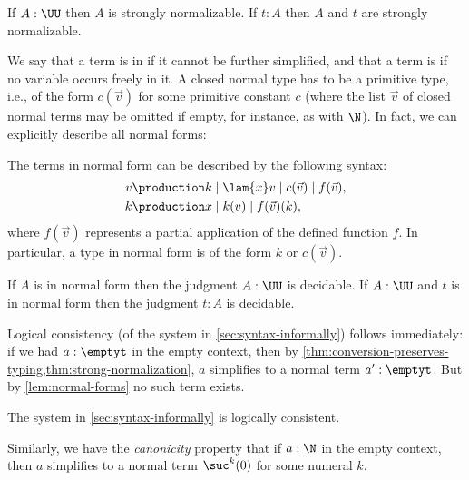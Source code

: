 \begin{thm}\label{thm:strong-normalization}
If $A : \UU$ then $A$ is strongly normalizable.
If $t:A$ then $A$ and $t$ are strongly normalizable.
\end{thm}

We say that a term is in 
%
%
if it cannot be further
simplified, and that a term is 
%
%
if no variable occurs freely in
it. A closed normal type has to be a primitive type, i.e., of the form
$c(\vec{v})$ for some primitive constant $c$ (where the list $\vec{v}$ of closed
normal terms may be omitted if empty, for instance, as with $\N$). In fact, we
can explicitly describe all normal forms:

\begin{lem}\label{lem:normal-forms}
  The terms in normal form can be described by the following syntax:
  \begin{align*}
    v & \production  k \mid \lam{x} v \mid c(\vec{v}) \mid f(\vec{v}), \\
    k &\production x \mid k(v) \mid f(\vec{v})(k),
  \end{align*}
  where $f(\vec{v})$ represents a partial application of the defined function $f$.
  In particular, a type in normal form is of the form $k$ or $c(\vec{v})$.
\end{lem}

\begin{thm}
  If $A$ is in normal form then the 
  judgment $A : \UU$ is decidable. If $A : \UU$ and $t$ is in normal form then the judgment
  $t:A$ is decidable.
\end{thm}

Logical consistency (of the system in \cref{sec:syntax-informally}) follows
immediately: if we had $a:\emptyt$ in the empty context, then by
\cref{thm:conversion-preserves-typing,thm:strong-normalization}, $a$
simplifies to a normal term $a':\emptyt$. But by
\cref{lem:normal-forms} no such term exists.

\begin{cor}
 The system in \cref{sec:syntax-informally} is logically consistent.
\end{cor}

Similarly, we have the \emph{canonicity} property that if $a:\N$ in the empty
context, then $a$ simplifies to a normal term $\suc^k(0)$ for some numeral $k$.

